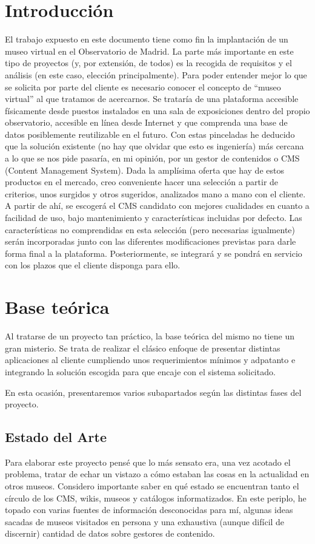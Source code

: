 

\section{Introducción}
El trabajo expuesto en este documento tiene como fin la implantación de un museo virtual en el Observatorio de Madrid. La parte más importante en este tipo de proyectos (y, por extensión, de todos) es la recogida de requisitos y el análisis (en este caso, elección principalmente).
Para poder entender mejor lo que se solicita por parte del cliente es necesario conocer el concepto de ``museo virtual'' al que tratamos de acercarnos. Se trataría de una plataforma accesible físicamente desde puestos instalados en una sala de exposiciones dentro del propio observatorio, accesible en línea desde Internet y que comprenda una base de datos posiblemente reutilizable en el futuro. Con estas pinceladas he deducido que la solución existente (no hay que olvidar que esto es ingeniería) más cercana a lo que se nos pide pasaría, en mi opinión, por un gestor de contenidos o CMS (Content Management System).
Dada la amplísima oferta que hay de estos productos en el mercado, creo conveniente hacer una selección a partir de criterios, unos surgidos y otros sugeridos, analizados mano a mano con el cliente.
A partir de ahí, se escogerá el CMS candidato con mejores cualidades en cuanto a facilidad de uso, bajo mantenimiento y características incluidas por defecto. Las características no comprendidas en esta selección (pero necesarias igualmente) serán incorporadas junto con las diferentes modificaciones previstas para darle forma final a la plataforma. Posteriormente, se integrará y se pondrá en servicio con los plazos que el cliente disponga para ello.

\section{Base teórica}
Al tratarse de un proyecto tan práctico, la base teórica del mismo no tiene un gran misterio. Se trata de realizar el clásico enfoque de presentar distintas aplicaciones al cliente cumpliendo unos requerimientos mínimos y adpatanto e integrando la solución escogida para que encaje con el sistema solicitado.

En esta ocasión, presentaremos varios subapartados según las distintas fases del proyecto.

\subsection{Estado del Arte}
\par Para elaborar este proyecto pensé que lo más sensato era, una vez acotado el problema, tratar de echar un vistazo a cómo estaban las cosas en la actualidad en otros museos. Considero importante saber en qué estado se encuentran tanto el círculo de los CMS, wikis, museos y catálogos informatizados.
En este periplo, he topado con varias fuentes de información desconocidas para mí, algunas ideas sacadas de museos visitados en persona y una exhaustiva (aunque difícil de discernir) cantidad de datos sobre gestores de contenido.

